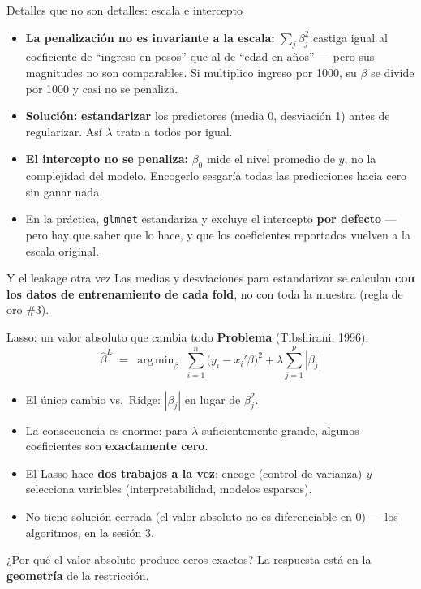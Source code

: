 \documentclass{beamer}
\newcommand{\1}{\mathbb{I}}
\DeclareMathOperator*{\argmin}{arg\,min}
\begin{document}
\begin{frame}{Detalles que no son detalles: escala e intercepto}
\small
\begin{itemize}\itemsep6pt
  \item \textbf{La penalización no es invariante a la escala:} $\sum_j \beta_j^2$ castiga igual al coeficiente de ``ingreso en pesos'' que al de ``edad en años'' --- pero sus magnitudes no son comparables. Si multiplico ingreso por 1000, su $\beta$ se divide por 1000 y casi no se penaliza. \pause
  \item \textbf{Solución:} \textbf{estandarizar} los predictores (media 0, desviación 1) antes de regularizar. Así $\lambda$ trata a todos por igual. \pause
  \item \textbf{El intercepto no se penaliza:} $\beta_0$ mide el nivel promedio de $y$, no la complejidad del modelo. Encogerlo sesgaría todas las predicciones hacia cero sin ganar nada. \pause
  \item En la práctica, \texttt{glmnet} estandariza y excluye el intercepto \textbf{por defecto} --- pero hay que saber que lo hace, y que los coeficientes reportados vuelven a la escala original.
\end{itemize}
\pause

\vspace{0.1cm}
\begin{block}{Y el leakage otra vez}
Las medias y desviaciones para estandarizar se calculan \textbf{con los datos de entrenamiento de cada fold}, no con toda la muestra (regla de oro \#3).
\end{block}
\end{frame}

\begin{frame}{Lasso: un valor absoluto que cambia todo}
\small
\textbf{Problema} (Tibshirani, 1996):
\[ \hat{\beta}^{L} \;=\; \argmin_{\beta} \; \sum_{i=1}^n \big(y_i - x_i'\beta\big)^2 + \lambda \sum_{j=1}^p |\beta_j| \]
\pause

\begin{itemize}\itemsep5pt
  \item El único cambio vs.\ Ridge: $|\beta_j|$ en lugar de $\beta_j^2$.
  \item La consecuencia es enorme: para $\lambda$ suficientemente grande, algunos coeficientes son \textbf{exactamente cero}. \pause
  \item El Lasso hace \textbf{dos trabajos a la vez}: encoge (control de varianza) \emph{y} selecciona variables (interpretabilidad, modelos esparsos).
  \item No tiene solución cerrada (el valor absoluto no es diferenciable en 0) --- los algoritmos, en la sesión 3. \pause
\end{itemize}

\vspace{0.2cm}
\begin{block}{¿Por qué el valor absoluto produce ceros exactos?}
La respuesta está en la \textbf{geometría} de la restricción.
\end{block}
\end{frame}
\end{document}
